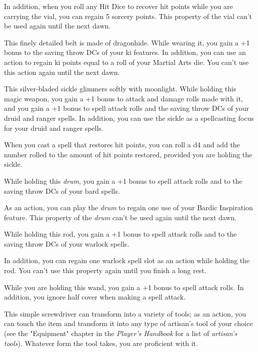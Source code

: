 \documentclass[10pt,a4paper,twoside,bg=print,twocolumn,openany,nodeprecatedcode]{dndbook}
\begin{document}
In addition, when you roll any Hit Dice to recover hit points while you are carrying the vial, you can regain 5 sorcery points. This property of the vial can't be used again until the next dawn.

This finely detailed belt is made of dragonhide. While wearing it, you gain a +1 bonus to the saving throw DCs of your ki features. In addition, you can use an action to regain ki points equal to a roll of your Martial Arts die. You can't use this action again until the next dawn.

This silver-bladed sickle glimmers softly with moonlight. While holding this magic weapon, you gain a +1 bonus to attack and damage rolls made with it, and you gain a +1 bonus to spell attack rolls and the saving throw DCs of your druid and ranger spells. In addition, you can use the sickle as a spellcasting focus for your druid and ranger spells.

When you cast a spell that restores hit points, you can roll a d4 and add the number rolled to the amount of hit points restored, provided you are holding the sickle.

While holding this \textit{drum}, you gain a +1 bonus to spell attack rolls and to the saving throw DCs of your bard spells.

As an action, you can play the \textit{drum} to regain one use of your Bardic Inspiration feature. This property of the \textit{drum} can't be used again until the next dawn.

While holding this rod, you gain a +1 bonus to spell attack rolls and to the saving throw DCs of your warlock spells.

In addition, you can regain one warlock spell slot as an action while holding the rod. You can't use this property again until you finish a long rest.

While you are holding this wand, you gain a +1 bonus to spell attack rolls. In addition, you ignore half cover when making a spell attack.

This simple screwdriver can transform into a variety of tools; as an action, you can touch the item and transform it into any type of artisan's tool of your choice (see the "Equipment" chapter in the \textit{Player's Handbook} for a list of \textit{artisan's tools}). Whatever form the tool takes, you are proficient with it.
\end{document}
